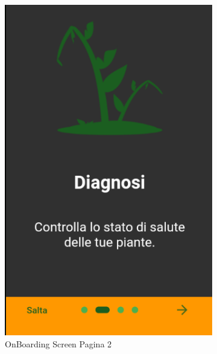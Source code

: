 \documentclass[a4paper,12pt]{report}
\begin{document}
\begin{figure}[H]
\begin{subfigure}{0.3\textwidth}
	\includegraphics[width=\textwidth]{./images/onboarding/onboarding_screen1_dark.png}
	\caption{OnBoarding Screen Pagina 2}
	\label{fig:onboarding1}
\end{subfigure}
\hfill
\begin{subfigure}{0.3\textwidth}

\end{subfigure}
\end{figure}
\end{document}

